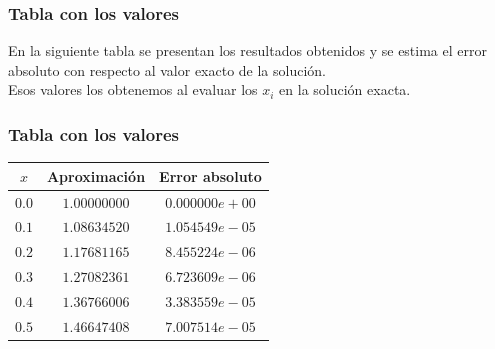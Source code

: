 \documentclass[12pt]{beamer}
\begin{document}
\begin{frame}
\frametitle{Tabla con los valores}
En la siguiente tabla se presentan los resultados obtenidos y se estima el error absoluto con respecto al valor exacto de la solución.
\\
\bigskip
\pause
Esos valores los obtenemos al evaluar los $x_{i}$ en la solución exacta.
\end{frame}
\begin{frame}
\frametitle{Tabla con los valores}
\begin{table}
\centering
\renewcommand*{\arraystretch}{0.9}
\begin{tabular}{ c c c}
$x$ & Aproximación & Error absoluto \\ \hline
$0.0$ & $1.00000000$ & $0.000000e+00$ \\ \hline
$0.1$ & $1.08634520$ & $1.054549e-05$ \\ \hline
$0.2$ & $1.17681165$ & $8.455224e-06$ \\ \hline
$0.3$ & $1.27082361$ & $6.723609e-06$ \\ \hline
$0.4$ & $1.36766006$ & $3.383559e-05$ \\ \hline
$0.5$ & $1.46647408$ & $7.007514e-05$ \\ \hline
\end{tabular}
\end{table}
\end{frame}
\end{document}
